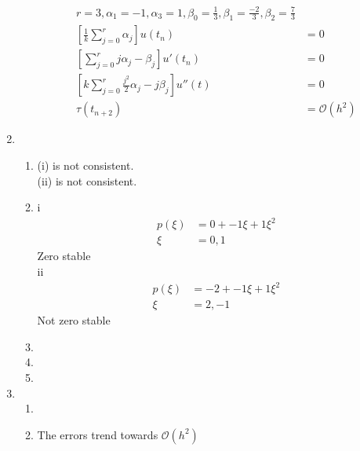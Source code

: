 \documentclass{article}
\begin{document}
\begin{enumerate}
\begin{enumerate}
\begin{equation*}
\begin{split}
		r=3, \alpha_{1} = -1, \alpha_{3} = 1, \beta_{0} = \frac{1}{3}, \beta_{1} = \frac{-2}{3}, \beta_{2} = \frac{7}{3} \\
		[\frac{1}{k} \sum_{j=0}^{r} \alpha_{j}] u(t_{n}) & = 0 \\
		[\sum_{j=0}^{r} j\alpha_{j} - \beta_{j}] u'(t_{n}) & = 0 \\
		[k \sum_{j=0}^{r} \frac{j^{2}}{2} \alpha_{j} - j \beta_{j}] u''(t) & =  0 \\
		\tau(t_{n+2}) & = \mathcal{O}(h^{2}) 
		\end{split}
		\end{equation*}
	\end{enumerate}
\item
	\begin{enumerate}
	\item 
(i) is not consistent. \\
(ii) is not consistent.
	\item 
i
		\begin{equation*}
		\begin{split}
		p(\xi) &= 0 + -1\xi + 1\xi^{2} \\
		\xi & = 0,1
		\end{split}
		\end{equation*}
Zero stable \\
ii
		\begin{equation*}
		\begin{split}
		p(\xi) &= -2 + -1\xi + 1\xi^{2} \\
		\xi & = 2, -1
		\end{split}
		\end{equation*}
Not zero stable
	\item
	\item
	\item
	\end{enumerate}
\item
\begin{enumerate}
\item
\item
The errors trend towards $\mathcal{O}(h^{2})$
\end{enumerate}
\end{enumerate}
\end{document}
